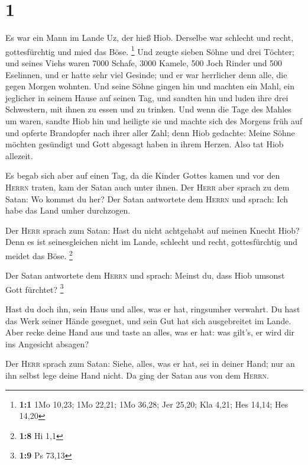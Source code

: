 \hypertarget{section}{%
\section{1}\label{section}}

 Es war ein Mann im Lande Uz, der hieß Hiob. Derselbe war
schlecht und recht, gottesfürchtig und mied das Böse. \footnote{\textbf{1:1}
  1Mo 10,23; 1Mo 22,21; 1Mo 36,28; Jer 25,20; Kla 4,21; Hes 14,14; Hes
  14,20}  Und zeugte sieben Söhne und drei Töchter;
 und seines Viehs waren 7000 Schafe, 3000 Kamele, 500 Joch
Rinder und 500 Eselinnen, und er hatte sehr viel Gesinde; und er war
herrlicher denn alle, die gegen Morgen wohnten.  Und seine
Söhne gingen hin und machten ein Mahl, ein jeglicher in seinem Hause auf
seinen Tag, und sandten hin und luden ihre drei Schwestern, mit ihnen zu
essen und zu trinken.  Und wenn die Tage des Mahles um
waren, sandte Hiob hin und heiligte sie und machte sich des Morgens früh
auf und opferte Brandopfer nach ihrer aller Zahl; denn Hiob gedachte:
Meine Söhne möchten gesündigt und Gott abgesagt haben in ihrem Herzen.
Also tat Hiob allezeit.

 Es begab sich aber auf einen Tag, da die Kinder Gottes
kamen und vor den \textsc{Herrn} traten, kam der Satan auch unter ihnen.
 Der \textsc{Herr} aber sprach zu dem Satan: Wo kommst du
her? Der Satan antwortete dem \textsc{Herrn} und sprach: Ich habe das
Land umher durchzogen.

 Der \textsc{Herr} sprach zum Satan: Hast du nicht
achtgehabt auf meinen Knecht Hiob? Denn es ist seinesgleichen nicht im
Lande, schlecht und recht, gottesfürchtig und meidet das Böse.
\footnote{\textbf{1:8} Hi 1,1}

 Der Satan antwortete dem \textsc{Herrn} und sprach:
Meinst du, dass Hiob umsonst Gott fürchtet? \footnote{\textbf{1:9} Ps
  73,13}

 Hast du doch ihn, sein Haus und alles, was er hat,
ringsumher verwahrt. Du hast das Werk seiner Hände gesegnet, und sein
Gut hat sich ausgebreitet im Lande.  Aber recke deine
Hand aus und taste an alles, was er hat: was gilt's, er wird dir ins
Angesicht absagen?

 Der \textsc{Herr} sprach zum Satan: Siehe, alles, was er
hat, sei in deiner Hand; nur an ihn selbst lege deine Hand nicht. Da
ging der Satan aus von dem \textsc{Herrn}.


